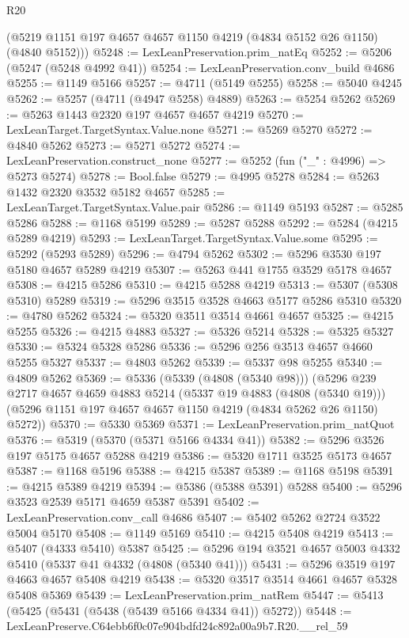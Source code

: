 \begin{lexlean}{R20}
\begin{coremodule}
      (@5219 @1151 @197 @4657 @4657 @1150 @4219 (@4834 @5152 @26 @1150) (@4840 @5152)))
@5248 := LexLeanPreservation.prim_natEq
@5252 := @5206 (@5247 (@5248 @4992 @41))
@5254 := LexLeanPreservation.conv_build @4686
@5255 := @1149 @5166
@5257 := @4711 (@5149 @5255)
@5258 := @5040 @4245
@5262 := @5257 (@4711 (@4947 @5258) @4889)
@5263 := @5254 @5262
@5269 := @5263 @1443 @2320 @197 @4657 @4657 @4219
@5270 := LexLeanTarget.TargetSyntax.Value.none
@5271 := @5269 @5270
@5272 := @4840 @5262
@5273 := @5271 @5272
@5274 := LexLeanPreservation.construct_none
@5277 := @5252 (fun ("_" : @4996) => @5273 @5274)
@5278 := Bool.false
@5279 := @4995 @5278
@5284 := @5263 @1432 @2320 @3532 @5182 @4657
@5285 := LexLeanTarget.TargetSyntax.Value.pair
@5286 := @1149 @5193
@5287 := @5285 @5286
@5288 := @1168 @5199
@5289 := @5287 @5288
@5292 := @5284 (@4215 @5289 @4219)
@5293 := LexLeanTarget.TargetSyntax.Value.some
@5295 := @5292 (@5293 @5289)
@5296 := @4794 @5262
@5302 := @5296 @3530 @197 @5180 @4657 @5289 @4219
@5307 := @5263 @441 @1755 @3529 @5178 @4657
@5308 := @4215 @5286
@5310 := @4215 @5288 @4219
@5313 := @5307 (@5308 @5310) @5289
@5319 := @5296 @3515 @3528 @4663 @5177 @5286 @5310
@5320 := @4780 @5262
@5324 := @5320 @3511 @3514 @4661 @4657
@5325 := @4215 @5255
@5326 := @4215 @4883
@5327 := @5326 @5214
@5328 := @5325 @5327
@5330 := @5324 @5328 @5286
@5336 := @5296 @256 @3513 @4657 @4660 @5255 @5327
@5337 := @4803 @5262
@5339 := @5337 @98 @5255
@5340 := @4809 @5262
@5369 := @5336
    (@5339 (@4808 (@5340 @98)))
    (@5296
      @239
      @2717
      @4657
      @4659
      @4883
      @5214
      (@5337 @19 @4883 (@4808 (@5340 @19)))
      (@5296 @1151 @197 @4657 @4657 @1150 @4219 (@4834 @5262 @26 @1150) @5272))
@5370 := @5330 @5369
@5371 := LexLeanPreservation.prim_natQuot
@5376 := @5319 (@5370 (@5371 @5166 @4334 @41))
@5382 := @5296 @3526 @197 @5175 @4657 @5288 @4219
@5386 := @5320 @1711 @3525 @5173 @4657
@5387 := @1168 @5196
@5388 := @4215 @5387
@5389 := @1168 @5198
@5391 := @4215 @5389 @4219
@5394 := @5386 (@5388 @5391) @5288
@5400 := @5296 @3523 @2539 @5171 @4659 @5387 @5391
@5402 := LexLeanPreservation.conv_call @4686
@5407 := @5402 @5262 @2724 @3522 @5004 @5170
@5408 := @1149 @5169
@5410 := @4215 @5408 @4219
@5413 := @5407 (@4333 @5410) @5387
@5425 := @5296 @194 @3521 @4657 @5003 @4332 @5410 (@5337 @41 @4332 (@4808 (@5340 @41)))
@5431 := @5296 @3519 @197 @4663 @4657 @5408 @4219
@5438 := @5320 @3517 @3514 @4661 @4657 @5328 @5408 @5369
@5439 := LexLeanPreservation.prim_natRem
@5447 := @5413 (@5425 (@5431 (@5438 (@5439 @5166 @4334 @41)) @5272))
@5448 := LexLeanPreserve.C64ebb6f0c07e904bdfd24c892a00a9b7.R20.__rel_59

\end{coremodule}
\end{lexlean}
